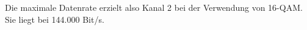 \documentclass{../exercisesheet}
\begin{document}
\begin{exercise}{4.5}
\begin{subexercise}
	Die maximale Datenrate erzielt also Kanal 2 bei der Verwendung von 16-QAM. Sie liegt bei 144.000 Bit/s.
	\end{subexercise}
\end{exercise}
\end{document}
